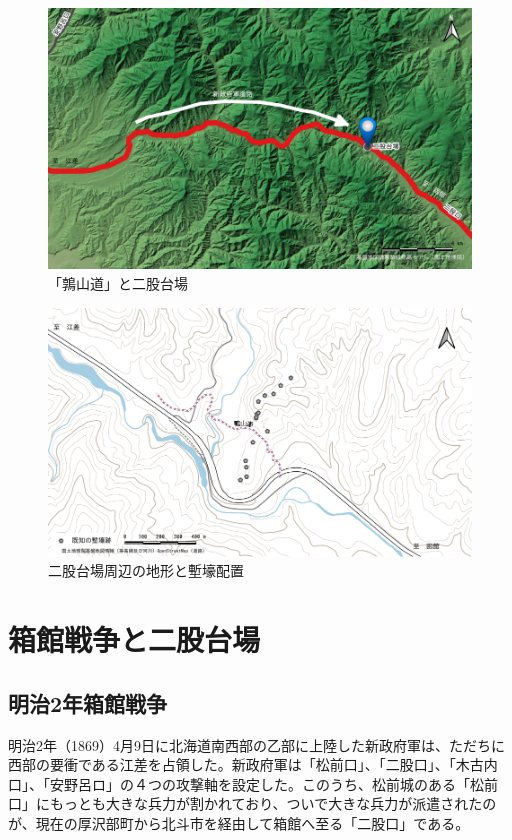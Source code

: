 \documentclass[14Q]{jsarticle}
\begin{document}
\begin{figure}[h]
\centering
\includegraphics[width=160truemm]{fig/oonoassabu.pdf}
\caption{「鶉山道」と二股台場}
\end{figure}

\begin{figure}[h]
\centering
\includegraphics[width=160truemm]{fig/haitizu.pdf}
\caption{二股台場周辺の地形と塹壕配置}
\label{haiti}
\end{figure}

\section{箱館戦争と二股台場}
\subsection{明治2年箱館戦争}
明治2年（1869）4月9日に北海道南西部の乙部に上陸した新政府軍は、ただちに西部の要衝である江差を占領した。新政府軍は「松前口」、「二股口」、「木古内口」、「安野呂ロ」の４つの攻撃軸を設定した。このうち、松前城のある「松前口」にもっとも大きな兵力が割かれており、ついで大きな兵力が派遣されたのが、現在の厚沢部町から北斗市を経由して箱館へ至る「二股口」である。
\end{document}
